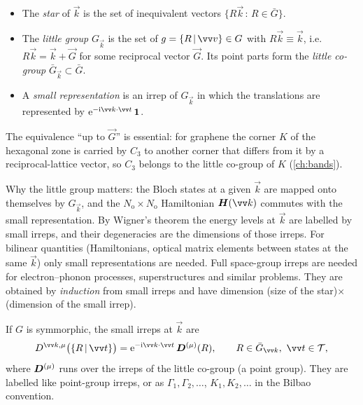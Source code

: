 \begin{definition}
\begin{itemize}
\item The \emph{star} of $\vec{k}$ is the set of inequivalent vectors
      $\{R\vec{k}\,:\,R\in\bar{G}\}$.
\item The \emph{little group} $G_{\vec{k}}$ is the set of $g=\seitz{R}{\vec{v}}\in G$
      with $R\vec{k}\equiv\vec{k}$, i.e.\ $R\vec{k}=\vec{k}+\vec{G}$ for some reciprocal
      vector $\vec{G}$. Its point parts form the \emph{little co-group}
      $\bar{G}_{\vec{k}}\subset\bar{G}$.
\item A \emph{small representation} is an irrep of $G_{\vec{k}}$ in which the
      translations are represented by $\ee^{-\ii\vec{k}\cdot\vec{t}}\,\one$.
\end{itemize}
\end{definition}
The equivalence ``up to $\vec{G}$'' is essential: for graphene the corner $K$ of the
hexagonal zone is carried by $C_3$ to another corner that differs from it by a
reciprocal-lattice vector, so $C_3$ belongs to the little co-group of $K$
(\cref{ch:bands}).

Why the little group matters: the Bloch states at a given $\vec{k}$ are mapped onto
themselves by $G_{\vec{k}}$, and the $N_{\mathrm{o}}\times N_{\mathrm{o}}$ Hamiltonian
$\mat{H}(\vec{k})$ commutes with the small representation. By Wigner's theorem the
energy levels at $\vec{k}$ are labelled by small irreps, and their degeneracies are the
dimensions of those irreps. For bilinear quantities (Hamiltonians, optical matrix
elements between states at the same $\vec{k}$) only small representations are needed.
Full space-group irreps are needed for electron--phonon processes, superstructures
and similar problems. They are obtained by \emph{induction} from small irreps and
have dimension (size of the star)$\times$(dimension of the small irrep).

\begin{keyresult}
If $G$ is symmorphic, the small irreps at $\vec{k}$ are
\begin{equation}\label{eq:smallsym}
D^{\vec{k},\mu}\bigl(\seitz{R}{\vec{t}}\bigr)=\ee^{-\ii\vec{k}\cdot\vec{t}}\,
\mat{D}^{(\mu)}(R),\qquad R\in\bar{G}_{\vec{k}},\ \vec{t}\in\Tgroup,
\end{equation}
where $\bm{D}^{(\mu)}$ runs over the irreps of the little co-group (a point group).
They are labelled like point-group irreps, or as $\Gamma_1,\Gamma_2,\dots$,
$K_1,K_2,\dots$ in the Bilbao convention.
\end{keyresult}

